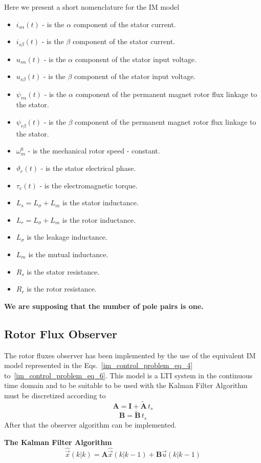 \documentclass[12pt,a4paper,oneside]{book}
\begin{document}
\begin{onehalfspace}
Here we present a short nomenclature for the IM model
\begin{itemize}
	\item[--] $i_{s\alpha}(t)$ - is the $\alpha$ component of the stator 
	current.
	\item[--] $i_{s\beta}(t)$ - is the $\beta$ component of the stator current.
	\item[--] $u_{s\alpha}(t)$ - is the $\alpha$ component of the stator input 
	voltage.
	\item[--] $u_{s\beta}(t)$ - is the $\beta$ component of the stator input 
	voltage.
	\item[--] $\psi_{r\alpha}(t)$ - is the $\alpha$ component of the permanent 
	magnet rotor flux linkage to the stator.
	\item[--] $\psi_{r\beta}(t)$ - is the $\beta$ component of the permanent 
	magnet rotor flux linkage to the stator.
	\item[--] $\omega_m^0$ - is the mechanical rotor speed - constant.
	\item[--] $\vartheta_e(t)$ - is the stator electrical phase.	
	\item[--] $\tau_e(t)$ - is the electromagnetic torque.
	\item[--] $L_s=L_\sigma+L_m$ is the stator inductance.
	\item[--] $L_r=L_\sigma+L_m$ is the rotor inductance.
	\item[--] $L_\sigma$ is the leakage inductance.
	\item[--] $L_m$ is the mutual inductance.
	\item[--] $R_s$ is the stator resistance.
	\item[--] $R_r$ is the rotor resistance.
\end{itemize}
\textbf{We are supposing that the number of pole pairs is one.}
\subsection{Rotor Flux Observer}
The rotor fluxes observer has been implemented by the use of the equivalent IM 
model represented in the Eqs.~\eqref{im_control_problem_eq_4} 
to~\eqref{im_control_problem_eq_6}. This model is a LTI system in the 
continuous time domain and to be suitable to be used with the Kalman Filter 
Algorithm must be discretized according to 
\begin{equation}\label{im_control_problem_eq_7}
	\mathbf{A} = \mathbf{I} + \tilde{\mathbf{A}} \,t_s
\end{equation}
\begin{equation}\label{im_control_problem_eq_8}
	\mathbf{B} = \tilde{\mathbf{B}} \,t_s
\end{equation}
After that the observer algorithm can be implemented.
\begin{mybox}
	\noindent\textbf{The Kalman Filter Algorithm}
	\begin{equation}\label{im_control_problem_eq_9}
		\hat{\vec{x}}\left(k|k\right) = \mathbf{A} 
		\hat{\vec{x}}\left(k|k-1\right) + \mathbf{B} \vec{u}\left(k|k-1\right)
	\end{equation}
	

\end{mybox}
\end{onehalfspace}
\end{document}
